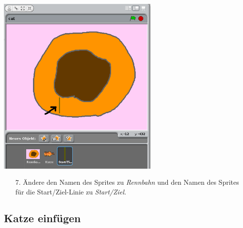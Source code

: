 \includegraphics[width=0.6\textwidth]{images/aufgabe4_rennbahn_malen_02.png}
\begin{itemize}
\item[7.] Ändere den Namen des Sprites zu \textit{Rennbahn} und den Namen des Sprites f{\"u}r die Start/Ziel-Linie zu \textit{Start/Ziel}.
\end{itemize}

\subsection{Katze einf{\"u}gen}

